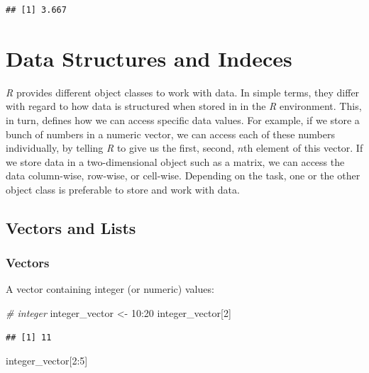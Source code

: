 \documentclass[
  12pt,
]{style/krantz}
\newenvironment{Shaded}{\begin{snugshade}}{\end{snugshade}}
\newcommand{\CommentTok}[1]{\textcolor[rgb]{0.56,0.35,0.01}{\textit{#1}}}
\newcommand{\DecValTok}[1]{\textcolor[rgb]{0.00,0.00,0.81}{#1}}
\newcommand{\NormalTok}[1]{#1}
\newcommand{\OtherTok}[1]{\textcolor[rgb]{0.56,0.35,0.01}{#1}}
\newcommand{\SpecialCharTok}[1]{\textcolor[rgb]{0.00,0.00,0.00}{#1}}
\begin{document}
\begin{verbatim}
## [1] 3.667
\end{verbatim}

\hypertarget{data-structures-and-indeces}{%
\section{Data Structures and Indeces}\label{data-structures-and-indeces}}

\emph{R} provides different object classes to work with data. In simple terms, they differ with regard to how data is structured when stored in in the \emph{R} environment. This, in turn, defines how we can access specific data values. For example, if we store a bunch of numbers in a numeric vector, we can access each of these numbers individually, by telling \emph{R} to give us the first, second, \(n\)th element of this vector. If we store data in a two-dimensional object such as a matrix, we can access the data column-wise, row-wise, or cell-wise. Depending on the task, one or the other object class is preferable to store and work with data.

\hypertarget{vectors-and-lists}{%
\subsection{Vectors and Lists}\label{vectors-and-lists}}

\hypertarget{vectors}{%
\subsubsection{Vectors}\label{vectors}}

A vector containing integer (or numeric) values:

\begin{Shaded}
\begin{Highlighting}[]
\CommentTok{\# integer}
\NormalTok{integer\_vector }\OtherTok{\textless{}{-}} \DecValTok{10}\SpecialCharTok{:}\DecValTok{20}
\NormalTok{integer\_vector[}\DecValTok{2}\NormalTok{]}
\end{Highlighting}
\end{Shaded}

\begin{verbatim}
## [1] 11
\end{verbatim}

\begin{Shaded}
\begin{Highlighting}[]
\NormalTok{integer\_vector[}\DecValTok{2}\SpecialCharTok{:}\DecValTok{5}\NormalTok{]}
\end{Highlighting}
\end{Shaded}
\end{document}
